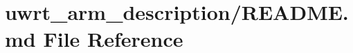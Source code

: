 \hypertarget{uwrt__arm__description_2_r_e_a_d_m_e_8md}{}\section{uwrt\+\_\+arm\+\_\+description/\+R\+E\+A\+D\+ME.md File Reference}
\label{uwrt__arm__description_2_r_e_a_d_m_e_8md}
